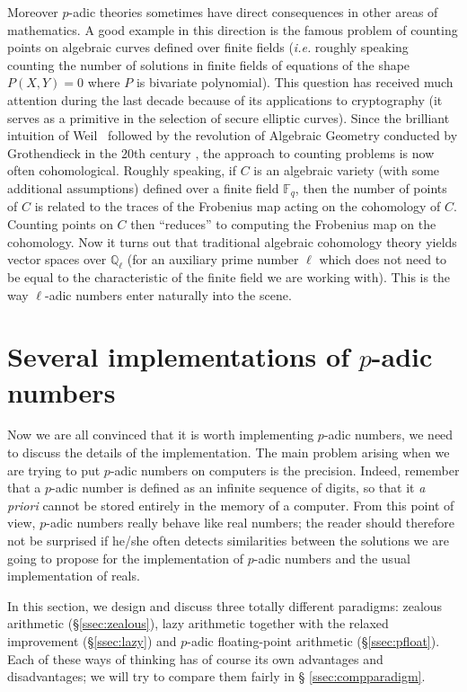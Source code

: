 \documentclass[11pt]{article}
\numberwithin{equation}{section}
\numberwithin{figure}{section}
\theoremstyle{definition}
\newcommand{\Q}{\mathbb Q}
\newcommand{\F}{\mathbb F}
\begin{document}
Moreover $p$-adic theories sometimes have direct consequences in other 
areas of mathematics. A good example in this direction is the famous 
problem of counting points on algebraic curves defined over finite 
fields (\emph{i.e.} roughly speaking counting the number of solutions in 
finite fields of equations of the shape $P(X,Y) = 0$ where $P$ is 
bivariate polynomial). This question has received much attention during
the last decade because of its applications to cryptography (it serves
as a primitive in the selection of secure elliptic curves).
Since the brilliant intuition of Weil~\cite{We49} followed by the revolution 
of Algebraic Geometry conducted by Grothendieck in the 20th century 
\cite{SGA}, the approach to counting problems is now often cohomological.
Roughly speaking, if $C$ is an algebraic variety (with some additional 
assumptions) defined over a finite field $\F_q$, then the number of points
of $C$ is related to the traces of the Frobenius map acting on the
cohomology of $C$. Counting points on $C$ then ``reduces'' to computing
the Frobenius map on the cohomology. Now it turns out that traditional
algebraic cohomology theory yields vector spaces over $\Q_\ell$ (for an 
auxiliary prime number $\ell$ which does not need to be equal to the 
characteristic of the finite field we are working with).
This is the way $\ell$-adic numbers enter naturally into the scene.

\section{Several implementations of $p$-adic numbers}
\label{sec:implementations}

Now we are all convinced that it is worth implementing $p$-adic numbers, 
we need to discuss the details of the implementation. The main problem 
arising when we are trying to put $p$-adic numbers on computers is the 
precision. Indeed, remember that a $p$-adic number is defined as an 
infinite sequence of digits, so that it \emph{a priori} cannot be stored 
entirely in the memory of a computer. From this point of view, $p$-adic 
numbers really behave like real numbers; the reader should therefore not 
be surprised if he/she often detects similarities between the solutions 
we are going to propose for the implementation of $p$-adic numbers and 
the usual implementation of reals.

In this section, we design and discuss three totally different 
paradigms: zealous arithmetic (\S \ref{ssec:zealous}), lazy 
arithmetic together with the relaxed improvement (\S \ref{ssec:lazy}) and 
$p$-adic floating-point arithmetic (\S \ref{ssec:pfloat}). Each of 
these ways of thinking has of course its own advantages and 
disadvantages; we will try to compare them fairly in \S
\ref{ssec:compparadigm}.
\end{document}
